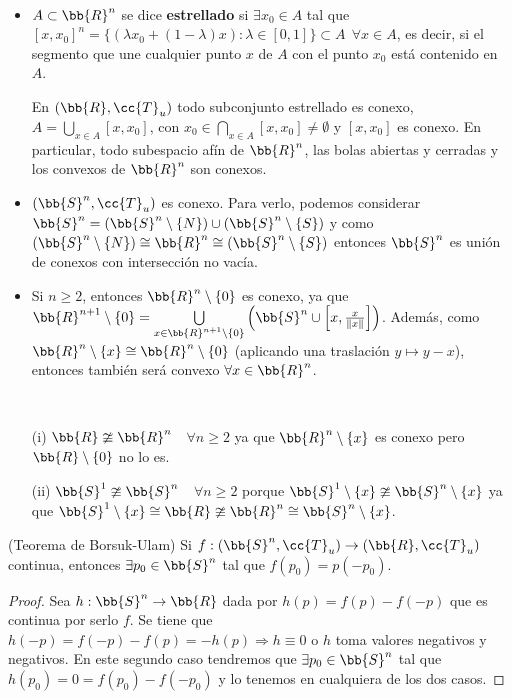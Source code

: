 \begin{ejemplo}\
    \begin{itemize}
        \item $A\subset \bb{R}^n$ se dice \textbf{estrellado} si $\exists x_0 \in A$ tal que $[x,x_0]^n = \{(\lambda x_0 + (1-\lambda)x):\lambda \in [0,1]\}\subset A\ \ \forall x \in A$, es decir, si el segmento que une cualquier punto $x$ de $A$ con el punto $x_0$ está contenido en $A$.
        
        En $(\bb{R}, \cc{T}_u)$ todo subconjunto estrellado es conexo, $A=\bigcup\limits_{x\in A}[x,x_0]$, con $x_0\in \bigcap\limits_{x\in A}[x,x_0]\neq \emptyset$ y $[x,x_0]$ es conexo. En particular, todo subespacio afín de $\bb{R}^n$, las bolas abiertas y cerradas y los convexos de $\bb{R}^n$ son conexos.

        \item $(\bb{S}^n, \cc{T}_u)$ es conexo. Para verlo, podemos considerar $\bb{S}^n=(\bb{S}^n\setminus \{N\})\cup (\bb{S}^n \setminus \{S\})$ y como $(\bb{S}^n\setminus \{N\}) \cong \bb{R}^n \cong(\bb{S}^n\setminus \{S\})$ entonces $\bb{S}^n$ es unión de conexos con intersección no vacía.
        
        \item Si $n\geq 2$, entonces $\bb{R}^n \setminus\{0\}$ es conexo, ya que $\bb{R}^{n+1} \setminus \{0\}=\bigcup\limits_{x\in \bb{R}^{n+1}\setminus \{0\}} \left(\bb{S}^n\cup \left[x, \frac{x}{\|x\|}\right] \right)$. Además, como $\bb{R}^n\setminus\{x\}\cong \bb{R}^n \setminus\{0\}$ (aplicando una traslación $y\mapsto y-x$), entonces también será convexo $\forall x \in \bb{R}^n$.
    \end{itemize}
    \endsquare
\end{ejemplo}

\begin{coro}\
    \begin{enumerate}
        \item[(i)] $\bb{R}\ncong \bb{R}^n$\ \ $\forall n\geq 2$ ya que $\bb{R}^n\setminus\{x\}$ es conexo pero $\bb{R}\setminus \{0\}$ no lo es.
        \item[(ii)] $\bb{S}^1 \ncong \bb{S}^n$\ \ $\forall n \geq 2$ porque $\bb{S}^1\setminus \{x\}\ncong \bb{S}^n\setminus \{x\}$ ya que $\bb{S}^1\setminus \{x\}\cong \bb{R} \ncong \bb{R}^n \cong \bb{S}^n \setminus \{x\}$. 
    \end{enumerate}
    \endsquare
\end{coro}

\begin{teo}
    (Teorema de Borsuk-Ulam) Si $f:(\bb{S}^n, \cc{T}_u)\to (\bb{R}, \cc{T}_u)$ continua, entonces $\exists p_0\in \bb{S}^n$ tal que $f(p_0)=p(-p_0)$.
    \begin{proof}
        Sea $h:\bb{S}^n \to \bb{R}$ dada por $h(p)=f(p)-f(-p)$ que es continua por serlo $f$. Se tiene que $h(-p)=f(-p)-f(p)=-h(p) \Rightarrow h\equiv 0$ o $h$ toma valores negativos y negativos. En este segundo caso tendremos que $\exists p_0 \in \bb{S}^n$ tal que $h(p_0)=0=f(p_0)-f(-p_0)$ y lo tenemos en cualquiera de los dos casos.

    \end{proof} 
\end{teo}

